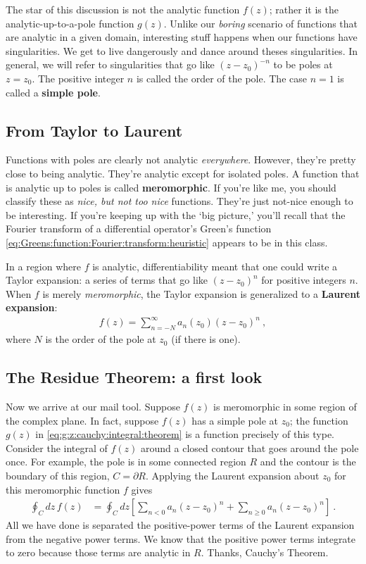 The star of this discussion is not the analytic function $f(z)$; rather it is the analytic-up-to-a-pole function $g(z)$. Unlike our \emph{boring} scenario of functions that are analytic in a given domain, interesting stuff happens when our functions have singularities. We get to live dangerously and dance around theses singularities. In general, we will refer to singularities that go like $(z-z_0)^{-n}$ to be poles at $z=z_0$. The positive integer $n$ is called the order of the pole. The case $n=1$ is called a \textbf{simple pole}.

\subsection{From Taylor to Laurent}

Functions with poles are clearly not analytic \emph{everywhere}. However, they're pretty close to being analytic. They're analytic except for isolated poles. A function that is analytic up to poles is called \textbf{meromorphic}. If you're like me, you should classify these as \emph{nice, but not too nice} functions. They're just not-nice enough to be interesting. If you're keeping up with the `big picture,' you'll recall that the Fourier transform of a differential operator's Green's function  \eqref{eq:Greens:function:Fourier:transform:heuristic} appears to be in this class.

In a region where $f$ is analytic, differentiability meant that one could write a Taylor expansion: a series of terms that go like $(z-z_0)^n$ for positive integers $n$. When $f$ is merely \emph{meromorphic}, the Taylor expansion is generalized to a \textbf{Laurent expansion}:
\begin{align}
	f(z) = \sum_{n=-N}^\infty  a_n(z_0) (z-z_0)^n \ ,
\end{align}
where $N$ is the order of the pole at $z_0$ (if there is one). 

\subsection{The Residue Theorem: a first look}

Now we arrive at our mail tool. Suppose $f(z)$ is meromorphic in some region of the complex plane. In fact, suppose $f(z)$ has a simple pole at $z_0$; the function $g(z)$ in \eqref{eq:g:z:cauchy:integral:theorem} is a function precisely of this type. Consider the integral of $f(z)$ around a closed contour that goes around the pole once. For example, the pole is in some connected region $R$ and the contour is the boundary of this region, $C=\partial R$. Applying the Laurent expansion about $z_0$ for this meromorphic function $f$ gives
\begin{align}
	\oint_C dz\, f(z) &= \oint_C dz 
	\left[
	\sum_{n<0} a_n (z-z_0)^n + \sum_{n\geq 0} a_n (z-z_0)^n
	\right] \ .
\end{align}
All we have done is separated the positive-power terms of the Laurent expansion from the negative power terms. We know that the positive power terms integrate to zero because those terms are analytic in $R$. Thanks, Cauchy's Theorem.

